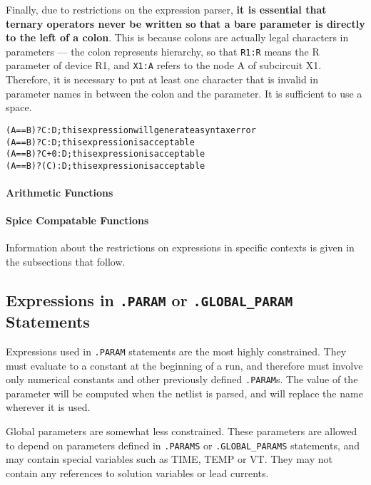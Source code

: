 Finally, due to restrictions on the expression parser, {\bf it is essential
that ternary operators never be written so that a bare parameter is
directly to the left of a colon}.  This is because colons are actually
legal characters in parameters --- the colon represents hierarchy, so
that \texttt{R1:R} means the R parameter of device R1, and
\texttt{X1:A} refers to the node A of subcircuit X1.  Therefore, it is
necessary to put at least one character that is invalid in parameter names
in between the colon and the parameter.  It is sufficient to use a space.
\begin{alltt}
    {\color{red} (A==B)?C:D}  ; this expression will generate a syntax error
    {(A==B)?C :D}  ; this expression is acceptable
    {(A==B)?C+0:D}  ; this expression is acceptable
    {(A==B)?(C):D}  ; this expression is acceptable
\end{alltt}

\paragraph{Arithmetic Functions}


\paragraph{Spice Compatable Functions}


Information about the restrictions on expressions in specific contexts
is given in the subsections that follow.

\subsection{Expressions in \texttt{.PARAM} or \texttt{.GLOBAL\_PARAM} Statements}

Expressions used in \texttt{.PARAM} statements are the most highly
constrained.  They must evaluate to a constant at the beginning of a
run, and therefore must involve only numerical constants and other
previously defined \texttt{.PARAM}s.  The value of the parameter will
be computed when the netlist is parsed, and will replace the name
wherever it is used.


Global parameters are somewhat less constrained.  These parameters are
allowed to depend on parameters defined in \texttt{.PARAMS} or
\texttt{.GLOBAL\_PARAMS} statements, and may contain special variables
such as \textrm{TIME}, \textrm{TEMP} or \textrm{VT}.  They may not contain any
references to solution variables or lead currents.

